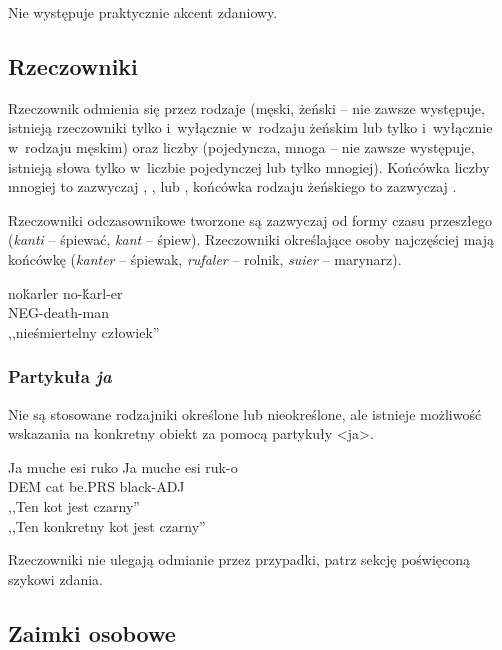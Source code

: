 \begin{spacing}{1.1}
Nie występuje praktycznie akcent zdaniowy.

\subsection{Rzeczowniki}
Rzeczownik odmienia się przez rodzaje (męski, żeński -- nie zawsze występuje,
istnieją rzeczowniki tylko i~wyłącznie w~rodzaju żeńskim lub tylko i~wyłącznie
w~rodzaju męskim) oraz liczby (pojedyncza, mnoga -- nie zawsze występuje,
istnieją słowa tylko w~liczbie pojedynczej lub tylko mnogiej). Końcówka liczby
mnogiej to zazwyczaj , ,  lub , końcówka rodzaju
żeńskiego to zazwyczaj .

Rzeczowniki odczasownikowe tworzone są zazwyczaj od formy czasu przeszłego
(\emph{kanti} -- śpiewać, \emph{kant} -- śpiew). Rzeczowniki określające osoby
najczęściej mają końcówkę  (\emph{kanter} -- śpiewak, \emph{rufaler} --
rolnik, \emph{suier} -- marynarz).

\begin{exe}
	\ex
	\trans noḱarler
	\gll  no-ḱarl-er \\
	  NEG-death-man \\
	\glt  ,,nieśmiertelny człowiek''
  \end{exe}

\subsubsection{Partykuła \emph{ja}}

Nie są stosowane rodzajniki określone lub nieokreślone, ale istnieje możliwość
wskazania na konkretny obiekt za pomocą partykuły <ja>.

\begin{exe}
	\ex
	\trans Ja muche esi ruko
	\gll  Ja muche esi ruk-o \\
	  DEM cat be.PRS black-ADJ \\
	\glt  ,,Ten kot jest czarny'' \\ ,,Ten konkretny kot jest czarny''
  \end{exe}

Rzeczowniki nie ulegają odmianie przez przypadki, patrz sekcję poświęconą
szykowi zdania.

\subsection{Zaimki osobowe}

\begin{multicols}{2}


\end{multicols}
\end{spacing}
